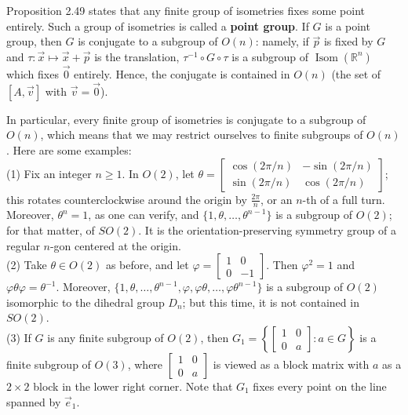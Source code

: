 \documentclass[leqno]{book}
\begin{document}
\noindent Proposition 2.49 states that any finite group of isometries fixes some point entirely.  Such a group of isometries is called a \textbf{point group}.  If $G$ is a point group, then $G$ is conjugate to a subgroup of $O(n)$: namely, if $\vec p$ is fixed by $G$ and $\tau:\vec x\mapsto\vec x+\vec p$ is the translation, $\tau^{-1}\circ G\circ\tau$ is a subgroup of $\operatorname{Isom}(\mathbb R^n)$ which fixes $\vec 0$ entirely.  Hence, the conjugate is contained in $O(n)$ (the set of $[A,\vec v]$ with $\vec v=\vec 0$).

In particular, every finite group of isometries is conjugate to a subgroup of $O(n)$, which means that we may restrict ourselves to finite subgroups of $O(n)$.  Here are some examples:\\

(1) Fix an integer $n\geqslant 1$.  In $O(2)$, let $\theta=\begin{bmatrix}\cos(2\pi/n)&-\sin(2\pi/n)\\\sin(2\pi/n)&\cos(2\pi/n)\end{bmatrix}$; this rotates counterclockwise around the origin by $\frac{2\pi}n$, or an $n$-th of a full turn.  Moreover, $\theta^n=1$, as one can verify, and $\{1,\theta,\dots,\theta^{n-1}\}$ is a subgroup of $O(2)$; for that matter, of $SO(2)$.  It is the orientation-preserving symmetry group of a regular $n$-gon centered at the origin.\\

(2) Take $\theta\in O(2)$ as before, and let $\varphi=\begin{bmatrix}1&0\\0&-1\end{bmatrix}$.  Then $\varphi^2=1$ and $\varphi\theta\varphi=\theta^{-1}$.  Moreover, $\{1,\theta,\dots,\theta^{n-1},\varphi,\varphi\theta,\dots,\varphi\theta^{n-1}\}$ is a subgroup of $O(2)$ isomorphic to the dihedral group $D_n$; but this time, it is not contained in $SO(2)$.\\

(3) If $G$ is any finite subgroup of $O(2)$, then $G_1=\left\{\begin{bmatrix}1&0\\0&a\end{bmatrix}:a\in G\right\}$ is a finite subgroup of $O(3)$, where $\begin{bmatrix}1&0\\0&a\end{bmatrix}$ is viewed as a block matrix with $a$ as a $2\times 2$ block in the lower right corner.  Note that $G_1$ fixes every point on the line spanned by $\vec e_1$.\\
\end{document}
